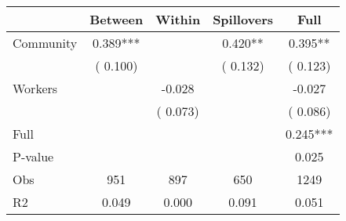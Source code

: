 
\begin{tabular}{l*{4}{c}}\hline&\multicolumn{1}{c}{Between}&\multicolumn{1}{c}{Within}&\multicolumn{1}{c}{Spillovers}&\multicolumn{1}{c}{Full}\\ \hline
 Community             &              0.389***      &                                               &        0.420** &         0.395**                            \\ 
                               &        (       0.100)           &                                       &       (       0.132)     &      (       0.123)                                           \\ 
 Workers       &                                               &       -0.028    &                                &            -0.027                            \\ 
                               &                                               & (       0.073)                  &                                        &      (       0.086)                                           \\ 
\hline                                                                                                                                                                                                                                            
 Full                  &                                               &                                               &                                        &             0.245***                                     \\ 
 P-value               &                                               &                                               &                                        &             0.025                                           \\ 
 Obs                   &               951               &       897                       &       650                &              1249                                               \\ 
 R2                    &                      0.049              &              0.000                      &              0.091               &                     0.051                                              \\ 
\hline \end{tabular}                                                                                                                                                                                                              